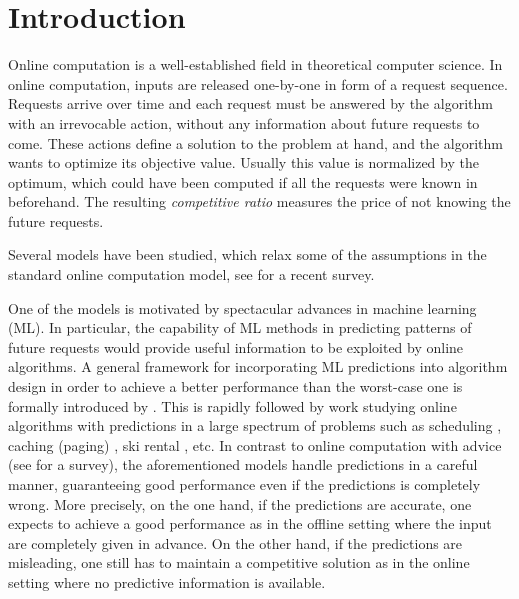 
\section{Introduction}



Online computation \cite{BorodinEl-Yaniv05:Online-computation} is a
well-established field in theoretical computer science. In online
computation, inputs are released one-by-one in form of a request sequence.
Requests arrive over time and each request must be answered by the algorithm
with an irrevocable action, without any information about future requests to
come. These actions define a solution to the problem at hand, and the
algorithm wants to optimize its objective value. Usually this value is
normalized by the optimum, which could have been computed if all the requests
were known in beforehand.  The resulting \emph{competitive ratio} measures
the price of not knowing the future requests.

Several models have been studied, which relax some of the assumptions in the standard online computation model, see  \cite{Roughgarden19:Beyond-worst-case,Roughgarden20:Beyond-the-Worst-Case} for a recent survey.

One of the models is motivated by spectacular advances in machine learning (ML). 
In particular, the capability of ML methods in predicting patterns of future requests would provide useful information to be exploited by online 
algorithms. A general framework for incorporating ML predictions into algorithm design in order to achieve a better performance than the worst-case one is formally introduced by \cite{LykourisVassilvtiskii18:Competitive-caching}. 
This is rapidly followed by work studying online algorithms with predictions \cite{MitzenmacherVassilvitskii20:Beyond-the-Worst-Case} 
in a large spectrum of problems 
such as scheduling \cite{LattanziLavastida20:Online-scheduling,Mitzenmacher20:Scheduling-with}, 
caching (paging) \cite{LykourisVassilvtiskii18:Competitive-caching,Rohatgi20:Near-optimal-bounds,AntoniadisCoester20:Online-metric}, 
ski rental \cite{GollapudiPanigrahi19:Online-algorithms,KumarPurohit18:Improving-online,AngelopoulosDurr20:Online-Computation}, etc.  In contrast to online computation with advice (see \cite{Komm16:Introduction-to-Online} for a survey), the aforementioned models handle predictions in a careful manner, guaranteeing good performance even if the predictions is completely wrong.
More precisely, on the one hand, if the predictions are accurate, one expects to achieve a good performance 
as in the offline setting where the input are completely given in advance. On the other hand, if the predictions are misleading, one still has to maintain a competitive solution as in the online setting where no predictive information is available.  



